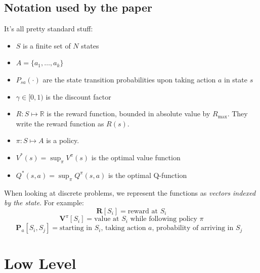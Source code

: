 \documentclass{article}
\begin{document}
    \subsection{Notation used by the paper}
    It's all pretty standard stuff:
    
    \begin{itemize}
        \item $S$ is a finite set of $N$ states
        \item $A = \{a_1, \dots, a_k\}$
        \item $P_{sa}(\cdot)$ are the state transition probabilities upon taking action $a$ in state $s$
        \item $\gamma \in [0,1)$ is the discount factor
        \item $R: S \mapsto \mathbb{R}$ is the reward function, bounded in absolute value by $R_{\max}$. They write the reward function as $R(s)$. 
        \item $\pi: S \mapsto A$ is a policy.
        \item $V^*(s) = \sup_\pi V^\pi (s)$ is the optimal value function
        \item $Q^*(s, a) = \sup_\pi Q^\pi (s, a)$ is the optimal Q-function
    \end{itemize}

    When looking at discrete problems, we represent the functions as \emph{vectors indexed by the state}.
    For example:
    $$\mathbf{R}[S_i] = \mbox{reward at $S_i$}$$  
    $$\mathbf{V}^\pi[S_i] = \mbox{value at $S_i$ while following policy $\pi$}$$  
    $$\mathbf{P}_a[S_i, S_j] = \mbox{starting in $S_i$, taking action $a$, probability of arriving in $S_j$ }$$  


    \section{Low Level}
\end{document}
